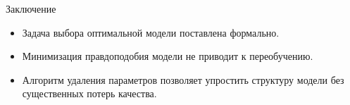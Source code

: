 \documentclass{beamer}
\begin{document}
\begin{frame}{Заключение}

\begin{itemize}
\item Задача выбора оптимальной модели поставлена формально.
\item Минимизация правдоподобия модели не приводит к переобучению.
\item Алгоритм удаления параметров позволяет упростить структуру модели без существенных потерь качества.
\end{itemize}

\end{frame}
\end{document}
